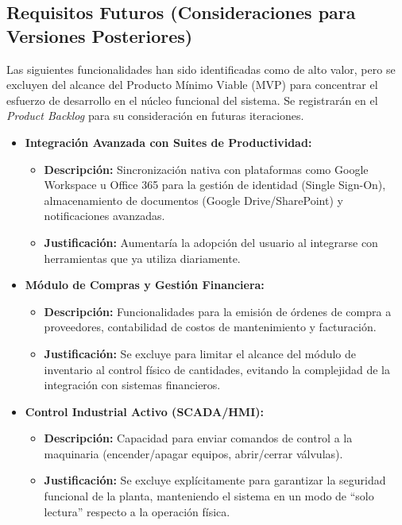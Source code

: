 \subsection{Requisitos Futuros (Consideraciones para Versiones Posteriores)}
Las siguientes funcionalidades han sido identificadas como de alto valor, pero se excluyen del alcance del Producto Mínimo Viable (MVP) para concentrar el esfuerzo de desarrollo en el núcleo funcional del sistema. Se registrarán en el \textit{Product Backlog} para su consideración en futuras iteraciones.

\begin{itemize}
    \item \textbf{Integración Avanzada con Suites de Productividad:}
    \begin{itemize}
        \item \textbf{Descripción:} Sincronización nativa con plataformas como Google Workspace u Office 365 para la gestión de identidad (Single Sign-On), almacenamiento de documentos (Google Drive/SharePoint) y notificaciones avanzadas.
        \item \textbf{Justificación:} Aumentaría la adopción del usuario al integrarse con herramientas que ya utiliza diariamente.
    \end{itemize}
    \item \textbf{Módulo de Compras y Gestión Financiera:}
    \begin{itemize}
        \item \textbf{Descripción:} Funcionalidades para la emisión de órdenes de compra a proveedores, contabilidad de costos de mantenimiento y facturación.
        \item \textbf{Justificación:} Se excluye para limitar el alcance del módulo de inventario al control físico de cantidades, evitando la complejidad de la integración con sistemas financieros.
    \end{itemize}
    \item \textbf{Control Industrial Activo (SCADA/HMI):}
    \begin{itemize}
        \item \textbf{Descripción:} Capacidad para enviar comandos de control a la maquinaria (encender/apagar equipos, abrir/cerrar válvulas).
        \item \textbf{Justificación:} Se excluye explícitamente para garantizar la seguridad funcional de la planta, manteniendo el sistema en un modo de ``solo lectura'' respecto a la operación física.
    \end{itemize}
\end{itemize}
